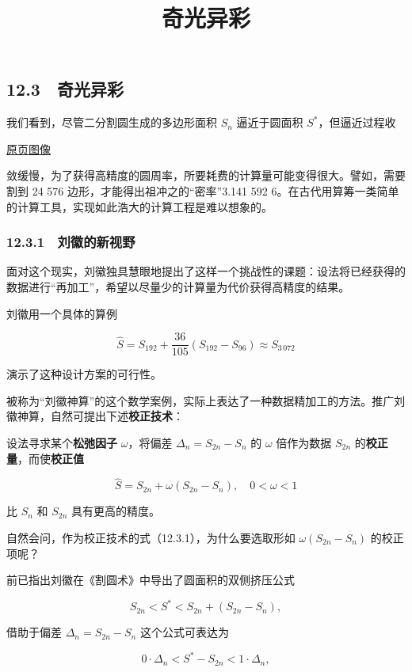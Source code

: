 \documentclass[
  10pt,
  fontset=fandol]{ctexart}
\title{奇光异彩}
\author{}
\date{}
\begin{document}
\maketitle

\subsection{12.3　奇光异彩}\label{ux5947ux5149ux5f02ux5f69}

我们看到，尽管二分割圆生成的多边形面积 \(S_n\) 逼近于圆面积 \(S^*\)，但逼近过程收

\href{../../source-images/pdf-298.jpeg}{原页图像}

敛缓慢，为了获得高精度的圆周率，所要耗费的计算量可能变得很大。譬如，需要割到 24 576 边形，才能得出祖冲之的``密率''3.141 592 6。在古代用算筹一类简单的计算工具，实现如此浩大的计算工程是难以想象的。

\subsubsection{12.3.1　刘徽的新视野}\label{ux5218ux5fbdux7684ux65b0ux89c6ux91ce}

面对这个现实，刘徽独具慧眼地提出了这样一个挑战性的课题：设法将已经获得的数据进行``再加工''，希望以尽量少的计算量为代价获得高精度的结果。

刘徽用一个具体的算例

\[
\widehat S=S_{192}+\frac{36}{105}(S_{192}-S_{96})\approx S_{3\,072}
\]

演示了这种设计方案的可行性。

被称为``刘徽神算''的这个数学案例，实际上表达了一种数据精加工的方法。推广刘徽神算，自然可提出下述\textbf{校正技术}：

设法寻求某个\textbf{松弛因子} \(\omega\)，将偏差 \(\Delta_n=S_{2n}-S_n\) 的 \(\omega\) 倍作为数据 \(S_{2n}\) 的\textbf{校正量}，而使\textbf{校正值}

\[
\widehat S=S_{2n}+\omega(S_{2n}-S_n),\quad 0<\omega<1
\tag{12.3.1}
\]

比 \(S_n\) 和 \(S_{2n}\) 具有更高的精度。

自然会问，作为校正技术的式（12.3.1），为什么要选取形如 \(\omega(S_{2n}-S_n)\) 的校正项呢？

前已指出刘徽在《割圆术》中导出了圆面积的双侧挤压公式

\[
S_{2n}<S^*<S_{2n}+(S_{2n}-S_n),
\]

借助于偏差 \(\Delta_n=S_{2n}-S_n\) 这个公式可表达为

\[
0\cdot\Delta_n<S^*-S_{2n}<1\cdot\Delta_n,
\]
\end{document}
